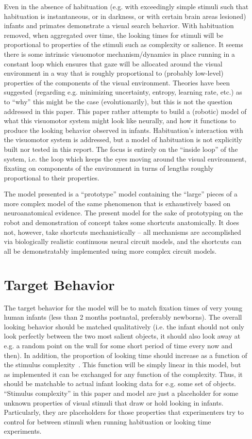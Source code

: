 \documentclass[conference]{IEEEtran}
\begin{document}
Even in the absence of habituation (e.g. with exceedingly simple
stimuli such that habituation is instantaneous, or in darkness, or
with certain brain areas lesioned) infants and primates demonstrate a
visual search behavior. With habituation removed, when aggregated over
time, the looking times for stimuli will be proportional to properties
of the stimuli such as complexity or salience. It seems there is some
intrinsic visuomotor mechanism/dynamics in place running in a constant
loop which ensures that gaze will be allocated around the visual
environment in a way that is roughly proportional to (probably
low-level) properties of the components of the visual
environment. Theories have been suggested (regarding e.g. minimizing
uncertainty, entropy, learning rate, etc.) as to ``why'' this might be
the case (evolutionarily), but this is not the question addressed in
this paper. This paper rather attempts to build a (robotic) model of
what this visuomotor system might look like neurally, and how it
functions to produce the looking behavior observed in
infants. Habituation's interaction with the visuomotor system is
addressed, but a model of habituation is not explicitly built nor
tested in this report. The focus is entirely on the ``inside loop'' of
the system, i.e. the loop which keeps the eyes moving around the
visual environment, fixating on components of the environment in turns
of lengths roughly proportional to their properties.

The model presented is a ``prototype'' model containing the ``large''
pieces of a more complex model of the same phenomenon that is
exhaustively based on neuroanatomical evidence. The present model for
the sake of prototyping on the robot and demonstration of concept
takes some shortcuts anatomically. It does not, however, take
shortcuts mechanistically -- all mechanisms are accomplished via
biologically realistic continuous neural circuit models, and the
shortcuts can all be demonstratably implemented using more complex
circuit models.

\section{Target Behavior}
The target behavior for the model will be to match fixation times of
very young human infants (less than 2 months postnatal, preferably
newborns). The overall looking behavior should be matched
qualitatively (i.e.  the infant should not only look perfectly between
the two most salient objects, it should also look away at e.g. a
random point on the wall for some short period of time every now and
then). In addition, the proportion of looking time should increase as
a function of the stimulus
complexity~\cite{lewis_kagan_kalafat_1966}. This function will be
simply linear in this model, but as implemented it can be exchanged
for any function of the complexity. Thus, it should be matchable to
actual infant looking data for e.g. some set of objects. ``Stimulus
complexity'' in this paper and model are just a placeholder for some
unknown properties of visual stimuli that draw or hold looking in
infants. Particularly, they are placeholders for those properties that
experimenters try to control for between stimuli when running
habituation or looking time experiments.
\end{document}
